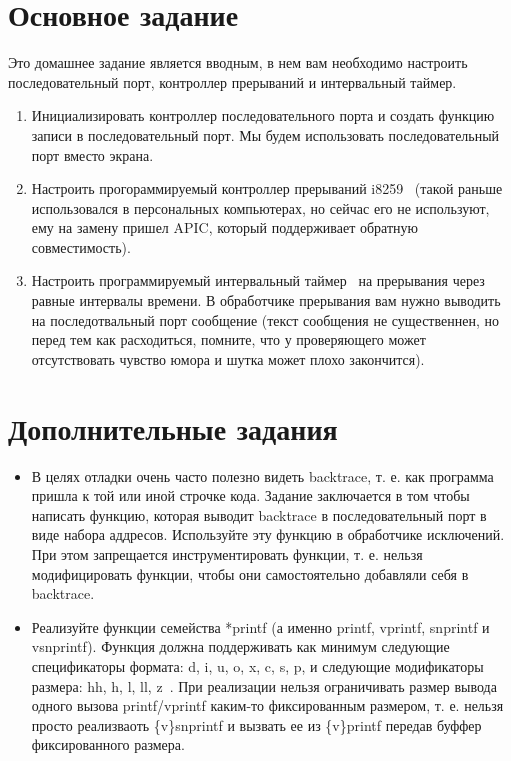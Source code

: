 \section{Основное задание}

Это домашнее задание является вводным, в нем вам необходимо настроить
последовательный порт, контроллер прерываний и интервальный таймер.

\begin{enumerate}
  \item Инициализировать контроллер последовательного порта и создать функцию
        записи в последовательный порт. Мы будем использовать последовательный
        порт вместо экрана.
  \item Настроить прогораммируемый контроллер прерываний i8259~\cite{INTEL:8259}
        (такой раньше использовался в персональных компьютерах, но сейчас его не
        используют, ему на замену пришел APIC, который поддерживает обратную
        совместимость).
  \item Настроить программируемый интервальный таймер~\cite{INTEL:8253} на
        прерывания через равные интервалы времени. В обработчике прерывания вам
        нужно выводить на последотвальный порт сообщение (текст сообщения не
        существеннен, но перед тем как расходиться, помните, что у проверяющего
        может отсутствовать чувство юмора и шутка может плохо закончится).
\end{enumerate}

\section{Дополнительные задания}

\begin{itemize}
  \item В целях отладки очень часто полезно видеть backtrace, т. е. как
        программа пришла к той или иной строчке кода. Задание заключается в том
        чтобы написать функцию, которая выводит backtrace в последовательный
        порт в виде набора аддресов. Используйте эту функцию в обработчике
        исключений. При этом запрещается инструментировать функции, т. е.
        нельзя модифицировать функции, чтобы они самостоятельно добавляли себя
        в backtrace.
  \item Реализуйте функции семейства *printf (а именно printf, vprintf,
        snprintf и vsnprintf). Функция должна поддерживать как минимум
        следующие спецификаторы формата: d, i, u, o, x, c, s, p, и следующие
        модификаторы размера: hh, h, l, ll, z~\cite{CPP:PRINTF}. При реализации
        нельзя ограничивать размер вывода одного вызова printf/vprintf каким-то
        фиксированным размером, т. е. нельзя просто реализваоть \{v\}snprintf и
        вызвать ее из \{v\}printf передав буффер фиксированного размера. 
\end{itemize}
